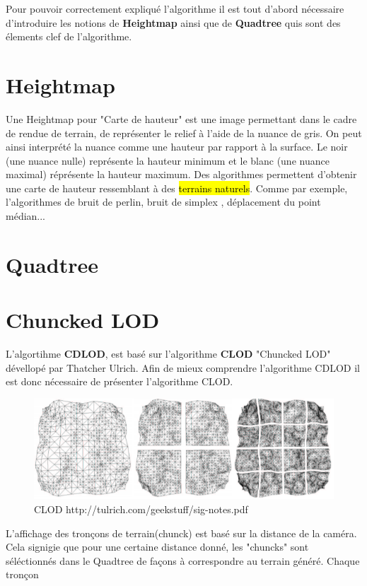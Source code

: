\documentclass[12pt]{report}
\begin{document}
 Pour pouvoir correctement expliqué l'algorithme il est tout d'abord nécessaire d'introduire les notions de  \textbf{Heightmap} ainsi que de \textbf{Quadtree} quis sont des élements clef de l'algorithme.
 
  \section{Heightmap}
  
  Une Heightmap pour "Carte de hauteur" est une image permettant dans le cadre de rendue de terrain, de représenter le relief à l'aide de la nuance de gris. On peut ainsi interprété la nuance comme une hauteur par rapport à la surface. Le noir (une nuance nulle) représente la hauteur minimum et le blanc (une nuance maximal) réprésente la hauteur maximum. Des algorithmes permettent d'obtenir une carte de hauteur ressemblant à des \hl{terrains naturels}. Comme par exemple, l'algorithmes de bruit de perlin, bruit de simplex , déplacement du point médian...
  
  
  \section{Quadtree}
  
  

 \section{Chuncked LOD}
  
  L'algortihme \textbf{CDLOD}, est basé sur l'algorithme \textbf{CLOD} "Chuncked LOD" dévellopé par Thatcher Ulrich.
  Afin de mieux comprendre l'algorithme CDLOD il est donc nécessaire de présenter l'algorithme CLOD.
  
\begin{figure}[!h]
    \includegraphics[width=12cm]{img/clod.png}
    \caption{CLOD http://tulrich.com/geekstuff/sig-notes.pdf}
    \label{fig:clod}
\end{figure}


  L'affichage des tronçons de terrain(chunck) est basé sur la distance de la caméra. Cela signigie que pour une certaine distance donné,
  les "chuncks" sont séléctionnés dans le Quadtree de façons à correspondre au terrain généré. Chaque tronçon 
\end{document}
